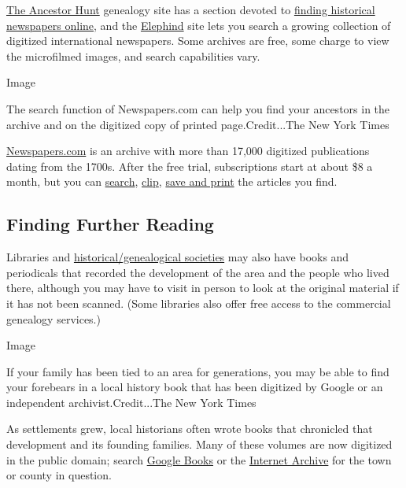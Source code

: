 \href{https://www.theancestorhunt.com}{The Ancestor Hunt} genealogy site
has a section devoted to
\href{https://www.theancestorhunt.com/newspaper-research-links.html}{finding
historical newspapers online}, and the
\href{https://elephind.com}{Elephind} site lets you search a growing
collection of digitized international newspapers. Some archives are
free, some charge to view the microfilmed images, and search
capabilities vary.

Image

The search function of Newspapers.com can help you find your ancestors
in the archive and on the digitized copy of printed page.Credit...The
New York Times

\href{https://www.newspapers.com}{Newspapers.com} is an archive with
more than 17,000 digitized publications dating from the 1700s. After the
free trial, subscriptions start at about \$8 a month, but you can
\href{https://www.newspapers.com/basics/\#h-search}{search},
\href{https://www.newspapers.com/basics/\#h-clips}{clip},
\href{https://www.newspapers.com/basics/\#h-print}{save and print} the
articles you find.

\hypertarget{finding-further-reading}{%
\subsection{Finding Further Reading}\label{finding-further-reading}}

Libraries and
\href{https://en.wikipedia.org/wiki/List_of_historical_societies\#County_and_local_societies}{historical/genealogical
societies} may also have books and periodicals that recorded the
development of the area and the people who lived there, although you may
have to visit in person to look at the original material if it has not
been scanned. (Some libraries also offer free access to the commercial
genealogy services.)

Image

If your family has been tied to an area for generations, you may be able
to find your forebears in a local history book that has been digitized
by Google or an independent archivist.Credit...The New York Times

As settlements grew, local historians often wrote books that chronicled
that development and its founding families. Many of these volumes are
now digitized in the public domain; search
\href{https://books.google.com}{Google Books} or the
\href{https://archive.org}{Internet Archive} for the town or county in
question.

